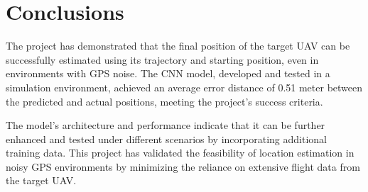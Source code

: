 \chapter{Conclusions}
The project has demonstrated that the final position of the target UAV can be successfully estimated using its trajectory and starting position, even in environments with GPS noise. The CNN model, developed and tested in a simulation environment, achieved an average error distance of 0.51 meter between the predicted and actual positions, meeting the project’s success criteria.

The model’s architecture and performance indicate that it can be further enhanced and tested under different scenarios by incorporating additional training data. This project has validated the feasibility of location estimation in noisy GPS environments by minimizing the reliance on extensive flight data from the target UAV.